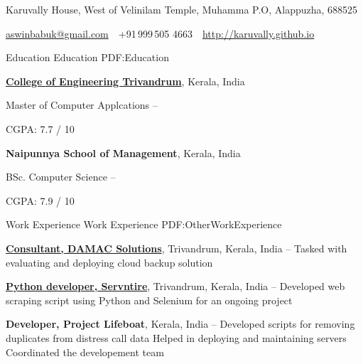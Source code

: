\documentclass[letterpaper,MMMyyyy,nonstopmode]{simpleresumecv}
\newcommand{\CVAuthor}{Aswin Babu Karuvally}
\newcommand{\CVWebpage}{http://karuvally.github.io}
\begin{document}

\Title{\CVAuthor}

\begin{SubTitle}
Karuvally House, West of Velinilam Temple, Muhamma P.O, Alappuzha, 688525
\par
\href{mailto:aswinbabuk@gmail.com}
{aswinbabuk@gmail.com}
\,\SubBulletSymbol\,
+91\,999\,505 4663
\,\SubBulletSymbol\,
\href{\CVWebpage}
{\url{\CVWebpage}}
\end{SubTitle}

\begin{Body}


\Section
{Education}
{Education}
{PDF:Education}

\Entry
\href{http://cet.ac.in}
{\textbf{College of Engineering Trivandrum}},
Kerala, India

\Gap
\BulletItem
Master of Computer Applcations
\hfill
{} --
\begin{Detail}
\SubBulletItem
CGPA: 7.7 / 10
\end{Detail}

\BigGap
\Entry
{\textbf{Naipunnya School of Management}},
Kerala, India

\Gap
\BulletItem
BSc. Computer Science
\hfill
{} --
\begin{Detail}
\SubBulletItem
CGPA: 7.9 / 10
\end{Detail}


\Section
{Work\newline
Experience}
{Work Experience}
{PDF:OtherWorkExperience}

\Entry
\href{http://damacsolutions.com}
{\textbf{Consultant, DAMAC Solutions}},
Trivandrum, Kerala, India
\hfill
{} -- 
\Gap
\BulletItem
Tasked with evaluating and deploying cloud backup solution

\BigGap
\Entry
\href{https://servntire.com/}
{\textbf{Python developer, Servntire}},
Trivandrum, Kerala, India
\hfill
{} -- 
\Gap
\BulletItem
Developed web scraping script using Python and Selenium for an ongoing project

\BigGap
\Entry
{\textbf{Developer, Project Lifeboat}},
Kerala, India
\hfill
{} -- 
\Gap
\BulletItem
Developed scripts for removing duplicates from distress call data
\BulletItem
Helped in deploying and maintaining servers
\BulletItem
Coordinated the developement team


\end{Body}
\end{document}
